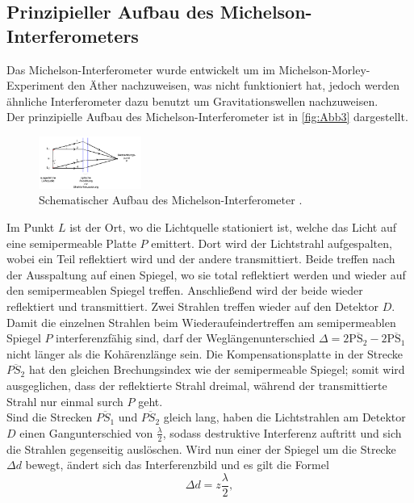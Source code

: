 \subsection{Prinzipieller Aufbau des Michelson-Interferometers}
\label{Aufbau_theo}
Das Michelson-Interferometer wurde entwickelt um im Michelson-Morley-Experiment den Äther nachzuweisen, was nicht funktioniert hat, jedoch werden 
ähnliche Interferometer dazu benutzt um Gravitationswellen nachzuweisen.\\
Der prinzipielle Aufbau des Michelson-Interferometer ist in \autoref{fig:Abb3} dargestellt.
\begin{figure}[H]
    \centering
    \includegraphics[width=0.3\textwidth]{build/Abb3.PNG}
    \caption {Schematischer Aufbau des Michelson-Interferometer \cite[3]{V401}.}
    \label{fig:Abb3}
\end{figure}
Im Punkt $L$ ist der Ort, wo die Lichtquelle stationiert ist, welche das Licht auf eine semipermeable Platte $P$ emittert.
Dort wird der Lichtstrahl aufgespalten, wobei ein Teil reflektiert wird und der andere transmittiert.
Beide treffen nach der Ausspaltung auf einen Spiegel, wo sie total reflektiert werden und wieder auf den semipermeablen Spiegel treffen.
Anschließend wird der beide wieder reflektiert und transmittiert. 
Zwei Strahlen treffen wieder auf den Detektor $D$. 
Damit die einzelnen Strahlen beim Wiederaufeindertreffen am semipermeablen Spiegel $P$ interferenzfähig sind, darf der Weglängenunterschied 
$ \Delta = 2\overline{\text{PS}_2} - 2\overline{\text{PS}_1} $ nicht länger als die Kohärenzlänge sein. 
Die Kompensationsplatte in der Strecke $\overline{PS_2}$ hat den gleichen Brechungsindex wie der semipermeable Spiegel; somit wird ausgeglichen,
dass der reflektierte Strahl dreimal, während der transmittierte Strahl nur einmal surch $P$ geht.\\
Sind die Strecken $\overline{PS_1}$ und $\overline{PS_2}$ gleich lang, haben die Lichtstrahlen am Detektor $D$ einen Gangunterschied von $\frac{\lambda}{2}$,
sodass destruktive Interferenz auftritt und sich die Strahlen gegenseitig auslöschen.
Wird nun einer der Spiegel um die Strecke $\Delta d$ bewegt, ändert sich das Interferenzbild und es gilt die Formel
\begin{equation}
    \Delta d = z \frac{\lambda}{2},
    \label{eqn:d}
\end{equation}
